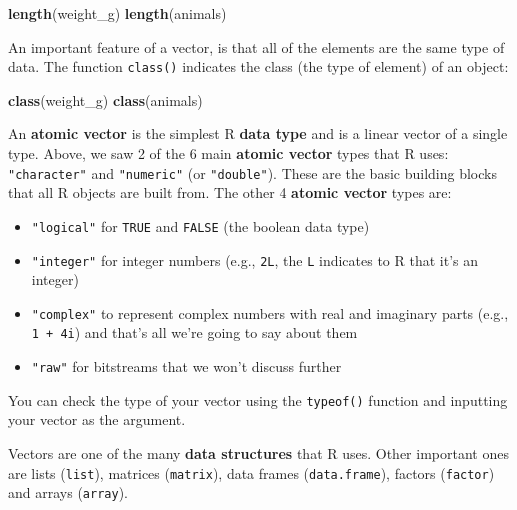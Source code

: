 \documentclass[]{book}
\newenvironment{Shaded}{\begin{snugshade}}{\end{snugshade}}
\newcommand{\KeywordTok}[1]{\textcolor[rgb]{0.13,0.29,0.53}{\textbf{#1}}}
\newcommand{\NormalTok}[1]{#1}
\providecommand{\tightlist}{%
  \setlength{\itemsep}{0pt}\setlength{\parskip}{0pt}}
\begin{document}
\begin{Shaded}
\begin{Highlighting}[]
\KeywordTok{length}\NormalTok{(weight_g)}
\KeywordTok{length}\NormalTok{(animals)}
\end{Highlighting}
\end{Shaded}

An important feature of a vector, is that all of the elements are the
same type of data. The function \texttt{class()} indicates the class
(the type of element) of an object:

\begin{Shaded}
\begin{Highlighting}[]
\KeywordTok{class}\NormalTok{(weight_g)}
\KeywordTok{class}\NormalTok{(animals)}
\end{Highlighting}
\end{Shaded}

An \textbf{atomic vector} is the simplest R \textbf{data type} and is a
linear vector of a single type. Above, we saw 2 of the 6 main
\textbf{atomic vector} types that R uses: \texttt{"character"} and
\texttt{"numeric"} (or \texttt{"double"}). These are the basic building
blocks that all R objects are built from. The other 4 \textbf{atomic
vector} types are:

\begin{itemize}
\tightlist
\item
  \texttt{"logical"} for \texttt{TRUE} and \texttt{FALSE} (the boolean
  data type)
\item
  \texttt{"integer"} for integer numbers (e.g., \texttt{2L}, the
  \texttt{L} indicates to R that it's an integer)
\item
  \texttt{"complex"} to represent complex numbers with real and
  imaginary parts (e.g., \texttt{1\ +\ 4i}) and that's all we're going
  to say about them
\item
  \texttt{"raw"} for bitstreams that we won't discuss further
\end{itemize}

You can check the type of your vector using the \texttt{typeof()}
function and inputting your vector as the argument.

Vectors are one of the many \textbf{data structures} that R uses. Other
important ones are lists (\texttt{list}), matrices (\texttt{matrix}),
data frames (\texttt{data.frame}), factors (\texttt{factor}) and arrays
(\texttt{array}).
\end{document}
